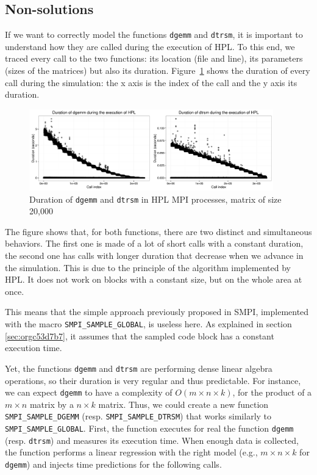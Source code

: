 \documentclass[12pt, a4paper]{memoir}
\begin{document}
\subsection{Non-solutions}
\label{sec:orgf8cefd2}
If we want to correctly model the functions \texttt{dgemm} and \texttt{dtrsm}, it is important to understand how they are called
during the execution of HPL. To this end, we traced every call to the two functions: its location (file and line),
its parameters (sizes of the matrices) but also its duration. Figure~\ref{fig:blas_duration} shows the duration of
every call during the simulation: the x axis is the index of the call and the y axis its duration.
\begin{figure}[htpb]
\centering
\includegraphics[width=400px]{../trace_visualization/blas_durations.png}
\caption{\label{fig:blas_duration}Duration of \texttt{dgemm} and \texttt{dtrsm} in HPL MPI processes, matrix of size 20,000}
\end{figure}
The figure shows that, for both functions, there are two distinct and simultaneous behaviors. The first one is made
of a lot of short calls with a constant duration, the second one has calls with longer duration that decrease when
we advance in the simulation. This is due to the principle of the algorithm implemented by HPL. It does not work on
blocks with a constant size, but on the whole area at once.

This means that the simple approach previously proposed in SMPI, implemented with the macro \texttt{SMPI\_SAMPLE\_GLOBAL}, is useless
here. As explained in section \ref{sec:orgc53d7b7}, it assumes that the sampled code block has a constant execution time.

Yet, the functions \texttt{dgemm} and \texttt{dtrsm} are performing dense linear algebra operations, so their duration is very regular
and thus predictable. For instance, we can expect \texttt{dgemm} to have a complexity of \(O(m \times n \times k)\), for the
product of a \(m \times n\) matrix by a \(n \times k\) matrix. Thus, we could create a new function \texttt{SMPI\_SAMPLE\_DGEMM}
(resp. \texttt{SMPI\_SAMPLE\_DTRSM}) that works similarly to \texttt{SMPI\_SAMPLE\_GLOBAL}. First, the function executes for real the function
\texttt{dgemm} (resp. \texttt{dtrsm}) and measures its execution time. When enough data is collected, the function performs a linear
regression with the right model (e.g., \(m \times n \times k\) for \texttt{dgemm}) and injects time predictions for the following calls.
\end{document}
